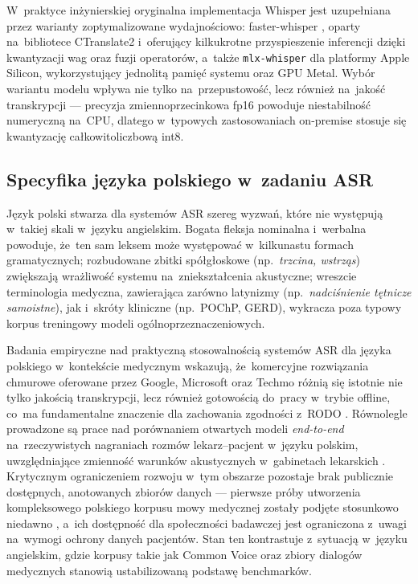 W~praktyce inżynierskiej oryginalna implementacja Whisper jest
uzupełniana przez warianty zoptymalizowane wydajnościowo: faster-whisper
\parencite{faster-whisper}, oparty na~bibliotece CTranslate2 i~oferujący
kilkukrotne przyspieszenie inferencji dzięki kwantyzacji wag oraz
fuzji operatorów, a~także \texttt{mlx-whisper} dla platformy Apple
Silicon, wykorzystujący jednolitą pamięć systemu oraz GPU Metal.
Wybór wariantu modelu wpływa nie tylko na~przepustowość, lecz również
na~jakość transkrypcji --- precyzja zmiennoprzecinkowa fp16 powoduje
niestabilność numeryczną na~CPU, dlatego w~typowych zastosowaniach
on-premise stosuje się kwantyzację całkowitoliczbową int8.

\subsection{Specyfika języka polskiego w~zadaniu ASR}

Język polski stwarza dla systemów ASR szereg wyzwań, które nie
występują w~takiej skali w~języku angielskim. Bogata fleksja
nominalna i~werbalna powoduje, że~ten sam leksem może występować
w~kilkunastu formach gramatycznych; rozbudowane zbitki spółgłoskowe
(np.~\emph{trzcina, wstrząs}) zwiększają wrażliwość systemu
na~zniekształcenia akustyczne; wreszcie terminologia medyczna,
zawierająca zarówno latynizmy (np.~\emph{nadciśnienie tętnicze
samoistne}), jak i~skróty kliniczne (np.~POChP, GERD), wykracza poza
typowy korpus treningowy modeli ogólnoprzeznaczeniowych.

Badania empiryczne nad praktyczną stosowalnością systemów ASR dla
języka polskiego w~kontekście medycznym wskazują, że~komercyjne
rozwiązania chmurowe oferowane przez Google, Microsoft oraz Techmo
różnią się istotnie nie tylko jakością transkrypcji, lecz również
gotowością do~pracy w~trybie offline, co~ma fundamentalne znaczenie
dla zachowania zgodności z~RODO \parencite{kuligowska2023asr}.
Równolegle prowadzone są prace nad porównaniem otwartych modeli
\emph{end-to-end} na~rzeczywistych nagraniach rozmów lekarz--pacjent
w~języku polskim, uwzględniające zmienność warunków akustycznych
w~gabinetach lekarskich \parencite{polishclinicalasr}. Krytycznym
ograniczeniem rozwoju w~tym obszarze pozostaje brak publicznie
dostępnych, anotowanych zbiorów danych --- pierwsze próby utworzenia
kompleksowego polskiego korpusu mowy medycznej zostały podjęte
stosunkowo niedawno \parencite{polishmedicalspeechdataset}, a~ich
dostępność dla społeczności badawczej jest ograniczona z~uwagi
na~wymogi ochrony danych pacjentów. Stan ten kontrastuje z~sytuacją
w~języku angielskim, gdzie korpusy takie jak Common Voice
\parencite{commonvoice} oraz zbiory dialogów medycznych stanowią
ustabilizowaną podstawę benchmarków.

